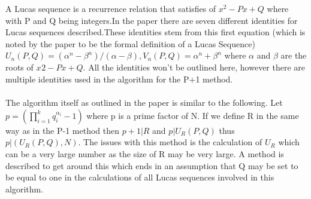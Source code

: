 \documentclass[12pt]{article} %
\begin{document}
	\indent A Lucas sequence is a recurrence relation that satisfies of $x^2 - Px+Q$ where with P and Q being integers.In the paper there are seven different identities for Lucas sequences described.These identities stem from this first equation (which is noted by the paper to be the formal definition of a Lucas Sequence)  $U_n(P,Q) = (\alpha^{n}-\beta^{n})/(\alpha-\beta), V_n(P,Q) = \alpha^{n}+\beta^{n}$ where $\alpha$ and $\beta$  are the roots of $x^{}2 - Px+Q$. All the identities won't be outlined here, however there are multiple identities used in the algorithm for the P+1 method. 
	\\\\
	\indent The algorithm itself as outlined in the paper is similar to the following. Let $p = (\prod^{k}_{i=1}q^{\alpha_i}_i - 1)$ where p is a prime factor of N. If we define R in the same way as in the P-1 method then $p+1|R$ and $p|U_R(P,Q)$ thus $p|(U_R(P,Q),N)$. The issues with this method is the calculation of $U_R$ which can be a very large number as the size of R may be very large. A method is described to get around this which ends in an assumption that Q may be set to be equal to one in the calculations of all Lucas sequences involved in this algorithm. 
	\\\\
\end{document}
